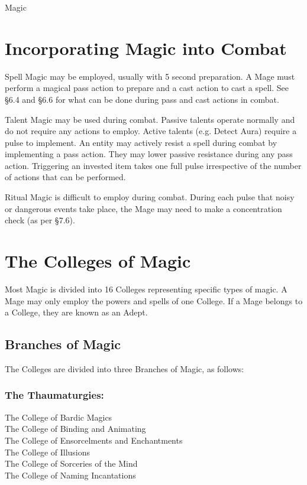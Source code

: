 \begin{Chapter}{Magic}
\section{Incorporating Magic into Combat}

Spell Magic may be employed, usually with 5 second preparation. A Mage
must perform a magical pass action to prepare and a cast action to
cast a spell. See §6.4 and §6.6 for what can be done during pass and
cast actions in combat.

Talent Magic may be used during combat. Passive talents operate
normally and do not require any actions to employ. Active talents
(e.g. Detect Aura) require a pulse to implement.  An entity may
actively resist a spell during combat by implementing a pass action.
They may lower passive resistance during any pass action. Triggering
an invested item takes one full pulse irrespective of the number of
actions that can be performed.

Ritual Magic is difficult to employ during combat.  During each pulse
that noisy or dangerous events take place, the Mage may need to make a
concentration check (as per §7.6).


\section{The Colleges of Magic}

Most Magic is divided into 16 Colleges representing specific types of
magic.  A Mage may only employ the powers and spells of one College.
If a Mage belongs to a College, they are known as an Adept.

\subsection{Branches of Magic}

The  Colleges  are  divided  into  three  Branches  of 
Magic, as follows: 

\subsubsection{The Thaumaturgies:}
The College of Bardic Magics \\
The College of Binding and Animating \\
The College of Ensorcelments and Enchantments \\
The College of Illusions \\
The College of Sorceries of the Mind \\
The College of Naming Incantations 


\end{Chapter}
